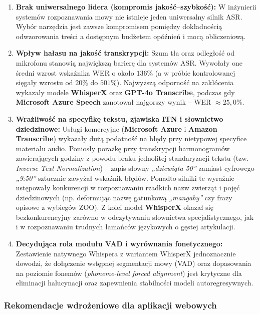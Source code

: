 \begin{enumerate}
    \item \textbf{Brak uniwersalnego lidera (kompromis jakość--szybkość):} W inżynierii systemów rozpoznawania mowy nie istnieje jeden uniwersalny silnik ASR. Wybór narzędzia jest zawsze kompromisem pomiędzy dokładnością odwzorowania treści a dostępnym budżetem opóźnień i mocą obliczeniową.
    \item \textbf{Wpływ hałasu na jakość transkrypcji:} Szum tła oraz odległość od mikrofonu stanowią największą barierę dla systemów ASR. Wywołały one średni wzrost wskaźnika WER o około $136\%$ (a w próbie kontrolowanej sięgały wzrostu od $20\%$ do $501\%$). Najwyższą odporność na zakłócenia wykazały modele \textbf{WhisperX} oraz \textbf{GPT-4o Transcribe}, podczas gdy \textbf{Microsoft Azure Speech} zanotował najgorszy wynik -- WER $\approx 25{,}0\%$.
    \item \textbf{Wrażliwość na specyfikę tekstu, zjawiska ITN i słownictwo dziedzinowe:} Usługi komercyjne (\textbf{Microsoft Azure} i \textbf{Amazon Transcribe}) wykazały dużą podatność na błędy przy nietypowej specyfice materiału audio. Poniosły porażkę przy transkrypcji harmonogramów zawierających godziny z powodu braku jednolitej standaryzacji tekstu (tzw. \textit{Inverse Text Normalization}) – zapis słowny \textit{„dziewiąta 50”} zamiast cyfrowego \textit{„9:50”} sztucznie zawyżał wskaźnik błędów. Ponadto silniki te wyraźnie ustępowały konkurencji w rozpoznawaniu rzadkich nazw zwierząt i pojęć dziedzinowych (np. deformując nazwę gatunkową \textit{„mangaby”} czy frazy opisowe z wybiegów ZOO). Z kolei model \textbf{WhisperX} okazał się bezkonkurencyjny zarówno w odczytywaniu słownictwa specjalistycznego, jak i w rozpoznawaniu trudnych łamańców językowych o gęstej artykulacji.
    \item \textbf{Decydująca rola modułu VAD i wyrównania fonetycznego:} Zestawienie natywnego Whispera z wariantem WhisperX jednoznacznie dowodzi, że dołączenie wstępnej segmentacji mowy (VAD) oraz dopasowania na poziomie fonemów (\textit{phoneme-level forced alignment}) jest krytyczne dla eliminacji halucynacji oraz zapewnienia stabilności modeli autoregresywnych.
\end{enumerate}

\subsubsection{Rekomendacje wdrożeniowe dla aplikacji webowych}
\label{subsubsec:implementation_recommendations}

